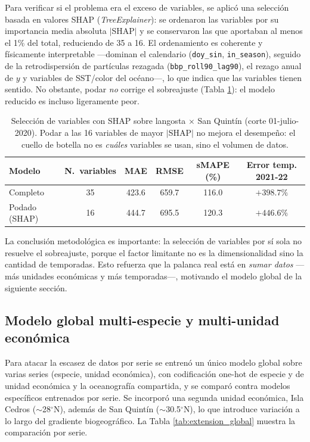 \documentclass[twoside,11pt]{article}
\begin{document}
Para verificar si el problema era el exceso de variables, se aplicó una selección basada en valores SHAP \cite{lundberg2017} (\emph{TreeExplainer}): se ordenaron las variables por su importancia media absoluta $|$SHAP$|$ y se conservaron las que aportaban al menos el 1\% del total, reduciendo de 35 a 16. El ordenamiento es coherente y físicamente interpretable ---dominan el calendario (\texttt{doy\_sin}, \texttt{in\_season}), seguido de la retrodispersión de partículas rezagada (\texttt{bbp\_roll90\_lag90}), el rezago anual de $y$ y variables de SST/color del océano---, lo que indica que las variables tienen sentido. No obstante, podar \emph{no} corrige el sobreajuste (Tabla \ref{tab:extension_shap}): el modelo reducido es incluso ligeramente peor.

\begin{table}[htbp]
\centering
\begin{tabular}{lccccc}
\toprule
Modelo & N.\ variables & MAE & RMSE & sMAPE (\%) & Error temp. 2021-22 \\
\midrule
Completo & 35 & 423.6 & 659.7 & 116.0 & $+398.7\%$ \\
Podado (SHAP) & 16 & 444.7 & 695.5 & 120.3 & $+446.6\%$ \\
\bottomrule
\end{tabular}
\caption{Selección de variables con SHAP sobre langosta $\times$ San Quintín (corte 01-julio-2020). Podar a las 16 variables de mayor $|$SHAP$|$ no mejora el desempeño: el cuello de botella no es \emph{cuáles} variables se usan, sino el volumen de datos.}
\label{tab:extension_shap}
\end{table}

La conclusión metodológica es importante: la selección de variables por sí sola no resuelve el sobreajuste, porque el factor limitante no es la dimensionalidad sino la cantidad de temporadas. Esto refuerza que la palanca real está en \emph{sumar datos} ---más unidades económicas y más temporadas---, motivando el modelo global de la siguiente sección.

\subsection{Modelo global multi-especie y multi-unidad económica}
Para atacar la escasez de datos por serie se entrenó un único modelo global sobre varias series (especie, unidad económica), con codificación one-hot de especie y de unidad económica y la oceanografía compartida, y se comparó contra modelos específicos entrenados por serie. Se incorporó una segunda unidad económica, Isla Cedros ($\sim$28$^\circ$N), además de San Quintín ($\sim$30.5$^\circ$N), lo que introduce variación a lo largo del gradiente biogeográfico. La Tabla \ref{tab:extension_global} muestra la comparación por serie.
\end{document}
